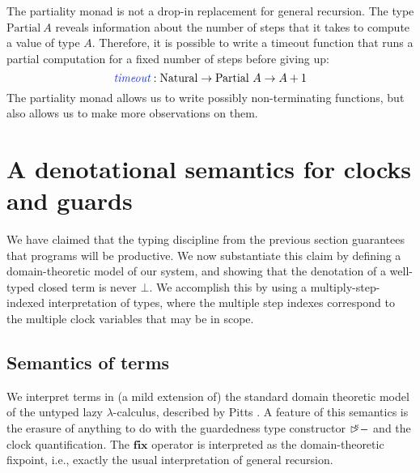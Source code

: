 \documentclass[natbib]{sigplanconf}
\newcommand{\kw}[1]{\textbf{#1}}
\newcommand{\tyname}[1]{\textrm{#1}}
\newcommand{\ident}[1]{\textit{#1}}
\newcommand{\defn}[1]{\textcolor{defnd}{\ident{#1}}}
\newcommand{\delay}[1]{\mathord{\rhd\kern-0.4em^{#1}}}
\begin{document}
The partiality monad is not a drop-in replacement for general
recursion. The type $\tyname{Partial}~A$ reveals information about the
number of steps that it takes to compute a value of type
$A$. Therefore, it is possible to write a timeout function that runs a
partial computation for a fixed number of steps before giving up:
\begin{displaymath}
  \defn{timeout} : \tyname{Natural} \to \tyname{Partial}~A \to A + 1
\end{displaymath}
The partiality monad allows us to write possibly non-terminating
functions, but also allows us to make more observations on them.

\section{A denotational semantics for clocks and guards}
\label{sec:semantics}

We have claimed that the typing discipline from the previous section
guarantees that programs will be productive. We now substantiate this
claim by defining a domain-theoretic model of our system, and showing
that the denotation of a well-typed closed term is never $\bot$. We
accomplish this by using a multiply-step-indexed interpretation of
types, where the multiple step indexes correspond to the multiple
clock variables that may be in scope.

\subsection{Semantics of terms}
\label{sec:semantics-of-programs}

We interpret terms in (a mild extension of) the standard domain
theoretic model of the untyped lazy $\lambda$-calculus, described by
Pitts \cite{PittsAM:compavm}. A feature of this semantics is the
erasure of anything to do with the guardedness type constructor
$\delay\kappa-$ and the clock quantification. The $\kw{fix}$ operator
is interpreted as the domain-theoretic fixpoint, i.e., exactly the
usual interpretation of general recursion.
\end{document}
